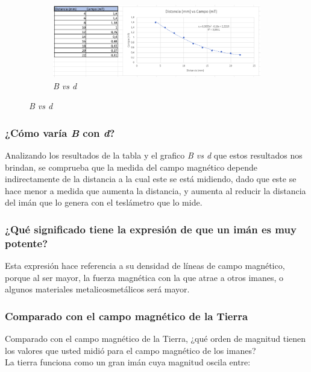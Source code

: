 \begin{figure}[H]
    \centering
    \begin{subfigure}[b]{0.8\textwidth}
        \centering
        \includegraphics[width=\textwidth]{Figures/0. General/1.5.png}
        \caption{\textit{B vs d}}
        \label{fig: style 1 B vs d}
    \end{subfigure}
\end{figure}


\subsubsection{¿Cómo varía \textit{B} con \textit{d}?}
Analizando los resultados de la tabla y el grafico \textit{B vs d} que estos
resultados nos brindan, se comprueba que la medida del campo magnético depende
indirectamente de la distancia a la cual este se está midiendo, dado que este se
hace menor a medida que aumenta la distancia, y aumenta al reducir la distancia
del imán que lo genera con el teslámetro que lo mide.


\subsubsection{¿Qué significado tiene la expresión de que un imán es muy potente?}
Esta expresión hace referencia a su densidad de líneas de campo magnético,
porque al ser mayor, la fuerza magnética con la que atrae a otros imanes, o
algunos materiales metalicosmetálicos será mayor.


\subsubsection{Comparado con el campo magnético de la Tierra}
Comparado con el campo magnético de la Tierra, ¿qué orden de magnitud tienen los
valores que usted midió para el campo magnético de los imanes?\\

La tierra funciona como un gran imán cuya magnitud oscila entre:\\

